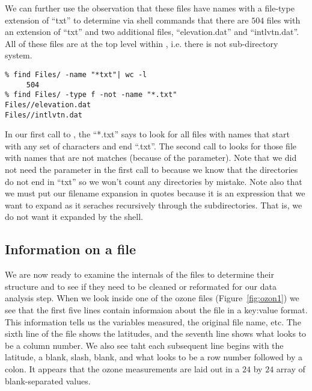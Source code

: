 We can further use the observation that these files have names with a
file-type extension of ``txt'' to determine via shell commands that
there are $504$ files with an extension of ``txt'' and two additional files,
``elevation.dat'' and ``intlvtn.dat''.  All of these files are at the
top level within , i.e. there is not sub-directory system.
\begin{verbatim}
% find Files/ -name "*txt"| wc -l
     504
% find Files/ -type f -not -name "*.txt"
Files//elevation.dat
Files//intlvtn.dat
\end{verbatim}
In our first call to , the ``*.txt'' says to look for
all files with names that start with any set of characters and end
``.txt''.  The second call to  looks for those file
with names that are not matches (because of the 
parameter).  Note that we did not need the  parameter
in the first call to  because we know that the
directories do not end in ``txt'' so we won't count any directories by
mistake.  Note also that we must put our filename expansion in
quotes because it is an expression that we want  to expand
as it seraches recursively through the subdirectories.  That is, we do
not want it expanded by the shell.


\subsection{Information on a file }
We are now ready to examine the internals of the files to determine
their structure and to see if they need to be cleaned or reformated for
our data analysis step.  When we look inside one of the ozone files (Figure~\ref{fig:ozon1}) we
see that the first five lines contain informaion about the file in a
key:value format.  This information tells us the variables measured, the
original file name, etc. The sixth line of the file shows the
latitudes, and the seventh line shows what looks to be a column
number.  We also see taht each subsequent line begins with the
latitude, a blank, slash, blank, and what looks to be a row number
followed by a colon.   It appears that the ozone measurements are laid
out in a $24$ by $24$ array of blank-separated values.

